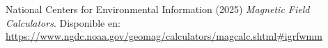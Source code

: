 \begin{thebibliography}{3}

     National Centers for Environmental Information (2025) \textit{Magnetic Field Calculators}.
    Disponible en: \url{https://www.ngdc.noaa.gov/geomag/calculators/magcalc.shtml#igrfwmm}
\end{thebibliography}

